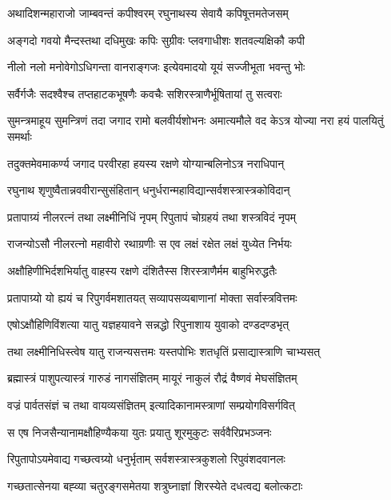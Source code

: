 \twolineshloka
{अथादिशन्महाराजो जाम्बवन्तं कपीश्वरम्}
{रघुनाथस्य सेवायै कपिषूत्तमतेजसम्}%

\twolineshloka
{अङ्गदो गवयो मैन्दस्तथा दधिमुखः कपिः}
{सुग्रीवः प्लवगाधीशः शतवल्यक्षिकौ कपी}%

\twolineshloka
{नीलो नलो मनोवेगोऽधिगन्ता वानराङ्गजः}
{इत्येवमादयो यूयं सज्जीभूता भवन्तु भोः}%

\twolineshloka
{सर्वैर्गजैः सदश्वैश्च तप्तहाटकभूषणैः}
{कवचैः सशिरस्त्राणैर्भूषितायां तु सत्वराः}%


\twolineshloka
{सुमन्त्रमाहूय सुमन्त्रिणं तदा जगाद रामो बलवीर्यशोभनः}
{अमात्यमौले वद केऽत्र योज्या नरा हयं पालयितुं समर्थाः}%

\twolineshloka
{तदुक्तमेवमाकर्ण्य जगाद परवीरहा}
{हयस्य रक्षणे योग्यान्बलिनोऽत्र नराधिपान्}%

\twolineshloka
{रघुनाथ शृणुष्वैतान्नववीरान्सुसंहितान्}
{धनुर्धरान्महाविद्यान्सर्वशस्त्रास्त्रकोविदान्}%

\twolineshloka
{प्रतापाग्र्यं नीलरत्नं तथा लक्ष्मीनिधिं नृपम्}
{रिपुतापं चोग्रहयं तथा शस्त्रविदं नृपम्}%

\twolineshloka
{राजन्योऽसौ नीलरत्नो महावीरो रथाग्रणीः}
{स एव लक्षं रक्षेत लक्षं युध्येत निर्भयः}%

\twolineshloka
{अक्षौहिणीभिर्दशभिर्यातु वाहस्य रक्षणे}
{दंशितैस्स शिरस्त्राणैर्मम बाहुभिरुद्धतैः}%

\twolineshloka
{प्रतापाग्र्यो यो ह्ययं च रिपुगर्वमशातयत्}
{सव्यापसव्यबाणानां मोक्ता सर्वास्त्रवित्तमः}%

\twolineshloka
{एषोऽक्षौहिणिविंशत्या यातु यज्ञहयावने}
{सन्नद्धो रिपुनाशाय युवाको दण्डदण्डभृत्}%

\twolineshloka
{तथा लक्ष्मीनिधिस्त्वेष यातु राजन्यसत्तमः}
{यस्तपोभिः शतधृतिं प्रसाद्यास्त्राणि चाभ्यसत्}%

\twolineshloka
{ब्रह्मास्त्रं पाशुपत्यास्त्रं गारुडं नागसंज्ञितम्}
{मायूरं नाकुलं रौद्रं वैष्णवं मेघसंज्ञितम्}%

\twolineshloka
{वज्रं पार्वतसंज्ञं च तथा वायव्यसंज्ञितम्}
{इत्यादिकानामस्त्राणां सम्प्रयोगविसर्गवित्}%

\twolineshloka
{स एष निजसैन्यानामक्षौहिण्यैकया युतः}
{प्रयातु शूरमुकुटः सर्ववैरिप्रभञ्जनः}%

\twolineshloka
{रिपुतापोऽयमेवाद्य गच्छत्वग्र्यो धनुर्भृताम्}
{सर्वशस्त्रास्त्रकुशलो रिपुवंशदवानलः}%

\twolineshloka
{गच्छतात्सेनया बह्व्या चतुरङ्गसमेतया}
{शत्रुघ्नाज्ञां शिरस्येते दधत्वद्य बलोत्कटाः}%

